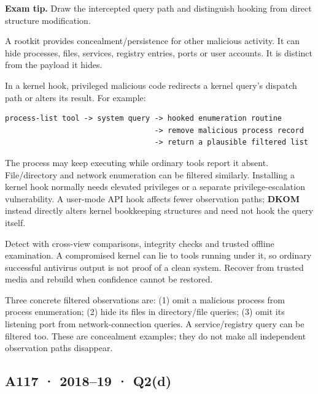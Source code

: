 \documentclass[11pt,a4paper]{article}
\begin{document}
{\color{ForestGreen}\textbf{Exam tip.} Draw the intercepted query path and distinguish hooking from direct structure modification.}


A rootkit provides concealment/\allowbreak{}persistence for other malicious activity. It can hide processes,\allowbreak{} files,\allowbreak{} services,\allowbreak{} registry entries,\allowbreak{} ports or user accounts. It is distinct from the payload it hides.


In a kernel hook,\allowbreak{} privileged malicious code redirects a kernel query's dispatch path or alters its result. For example:



\begin{Verbatim}[breaklines=true,breakanywhere=true,fontsize=\small,frame=single,rulecolor=\color{PanelBorder}]
process-list tool -> system query -> hooked enumeration routine
                                  -> remove malicious process record
                                  -> return a plausible filtered list
\end{Verbatim}

The process may keep executing while ordinary tools report it absent. File/\allowbreak{}directory and network enumeration can be filtered similarly. Installing a kernel hook normally needs elevated privileges or a separate privilege-escalation vulnerability. A user-mode API hook affects fewer observation paths; \textbf{DKOM} instead directly alters kernel bookkeeping structures and need not hook the query itself.


Detect with cross-view comparisons,\allowbreak{} integrity checks and trusted offline examination. A compromised kernel can lie to tools running under it,\allowbreak{} so ordinary successful antivirus output is not proof of a clean system. Recover from trusted media and rebuild when confidence cannot be restored.


Three concrete filtered observations are: (1) omit a malicious process from process enumeration; (2) hide its files in directory/\allowbreak{}file queries; (3) omit its listening port from network-connection queries. A service/\allowbreak{}registry query can be filtered too. These are concealment examples; they do not make all independent observation paths disappear.




\clearpage
\subsection{A117 · 2018–19 · Q2(d)}\label{a117}
\end{document}

